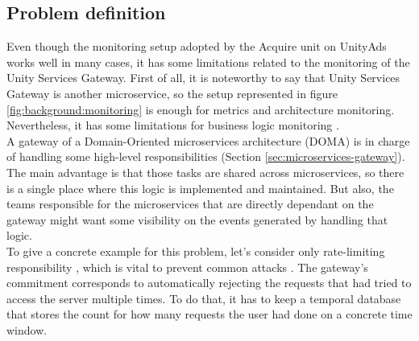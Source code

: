 \documentclass[english, 12pt, a4paper, sci, utf8, a-1b, online]{aaltothesis}
\begin{document}
\subsection{Problem definition}
\label{sec:problem-definition}





Even though the monitoring setup adopted by the Acquire unit on UnityAds works well in many cases, it has some limitations related to the monitoring of the Unity Services Gateway. First of all, it is noteworthy to say that Unity Services Gateway is another microservice, so the setup represented in figure \ref{fig:background:monitoring} is enough for metrics and architecture monitoring. Nevertheless, it has some limitations for business logic monitoring \cite{von2009decision}.\\

A gateway of a Domain-Oriented microservices architecture (DOMA) is in charge of handling some high-level responsibilities (Section \ref{sec:microservices-gateway}). The main advantage is that those tasks are shared across microservices, so there is a single place where this logic is implemented and maintained. But also, the teams responsible for the microservices that are directly dependant on the gateway might want some visibility on the events generated by handling that logic.\\

To give a concrete example for this problem, let's consider only rate-limiting responsibility \cite{raghavan2007cloud}, which is vital to prevent common attacks \cite{jhaveri2012attacks}. The gateway's commitment corresponds to automatically rejecting the requests that had tried to access the server multiple times. To do that, it has to keep a temporal database that stores the count for how many requests the user had done on a concrete time window.\\
\end{document}
